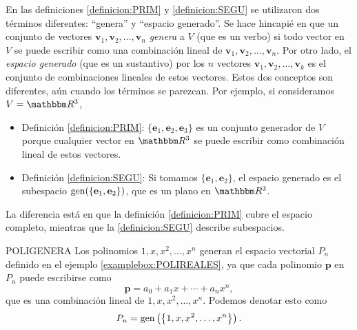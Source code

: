 En las definiciones \ref{definicion:PRIM} y \ref{definicion:SEGU} se utilizaron dos términos diferentes: “genera” y “espacio generado”. Se hace hincapié en que un conjunto de vectores $\mathbf{v}_1, \mathbf{v}_2, \dots, \mathbf{v}_n$ \emph{genera} a $V$ (que es un verbo) si todo vector en $V$ se puede escribir como una combinación lineal de $\mathbf{v}_1, \mathbf{v}_2, \dots, \mathbf{v}_n$. Por otro lado, el \emph{espacio generado} (que es un sustantivo) por los $n$ vectores $\mathbf{v}_1, \mathbf{v}_2, \dots, \mathbf{v}_k$ es el conjunto de combinaciones lineales de estos vectores. Estos dos conceptos son diferentes, aún cuando los términos se parezcan. Por ejemplo, si consideramos $V = \RR[3]$,
\begin{itemize}
    \item Definición \ref{definicion:PRIM}: $\{\mathbf{e}_1, \mathbf{e}_2, \mathbf{e}_3\}$ es un conjunto generador de $V$ porque cualquier vector en $\RR[3]$ se puede escribir como combinación lineal de estos vectores.
    \item Definición \ref{definicion:SEGU}: Si tomamos $\{\mathbf{e}_1, \mathbf{e}_2\}$, el espacio generado es el subespacio $\operatorname{gen} (\{\mathbf{e}_1, \mathbf{e}_2\})$, que es un plano en $\RR[3]$.
\end{itemize}
La diferencia está en que la definición \ref{definicion:PRIM} cubre el espacio completo, mientras que la \ref{definicion:SEGU} describe subespacios.

\begin{examplebox}{}{POLIGENERA}
    Los polinomios $1, x, x^2, \dots, x^n$ generan el espacio vectorial $P_n$ definido en el ejemplo \ref{examplebox:POLIREALES}, ya que cada polinomio $\mathbf{p}$ en $P_n$ puede escribirse como
    $$\mathbf{p} = a_0 + a_1x + \cdots + a_nx^n,$$
    que es una combinación lineal de $1, x, x^2, \dots, x^n$. Podemos denotar esto como
    $$P_n = \operatorname{gen}\left(\left\{1, x, x^2, \dots, x^n\right\}\right).$$
\end{examplebox}

\newpage

